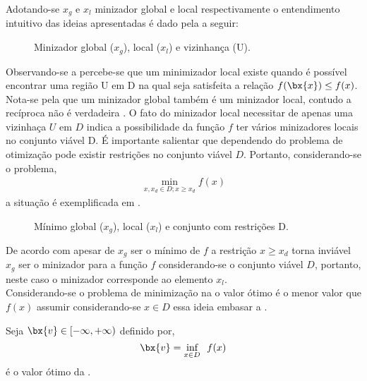   Adotando-se $x_g$ e $x_l$ minizador global e local respectivamente o entendimento intuitivo das ideias apresentadas
  \'e dado pela  a seguir:
  	\begin{figure}[!h]%
		\label{fig1}
		\centering
		\resizebox{0.8\width}{!}{
		 
  	}
		\caption{Minizador global ($x_g$), local ($x_l$) e vizinhan\c ca (U).}
  	\end{figure}

  Observando-se a  percebe-se  que um minimizador local existe quando \'e poss\'ivel
  encontrar uma regi\~ao $\mathrm{U}$ em $\mathrm{D}$ na qual seja satisfeita a rela\c c\~ao $f(\bx{x}) \leq f(x)$.
  Nota-se pela  que um minizador global tamb\'em \'e um minizador local, contudo a rec\'iproca n\~ao 
  \'e verdadeira \cite{alexey}. O fato do minizador local necessitar de apenas uma vizinha\c ca $U$ em $D$  indica a possibilidade da fun\c
  c\~ao $f$ ter 
  v\'arios minizadores locais no conjunto vi\'avel D. \'E importante salientar que dependendo do problema de otimiza\c
  c\~ao pode existir restri\c c\~oes no conjunto vi\'avel $D$. Portanto, considerando-se o problema,
  	\begin{align}%
		\min_{x,x_d \in D; x \geq x_d} f(x)
		\label{eq3}
	\end{align}
  a situa\c c\~ao \'e exemplificada em .
  	\begin{figure}[!htpb]%
		\centering
		\resizebox{0.8\width}{!}{
			
	}
		\caption{M\'inimo global ($x_g$), local ($x_l$) e conjunto com restri\c c\~oes D.}
  		\label{fig11}
	\end{figure}
	\newpage
De acordo com  apesar de $x_g$ ser o m\'inimo de $f$ a restri\c c\~ao $ x\geq x_d$ torna invi\'avel $x_g$
ser o minizador para a fun\c c\~ao $f$ considerando-se o conjunto vi\'avel $D$, portanto, neste caso o minizador
corresponde ao elemento $x_l$.\\
  Considerando-se o problema de minimiza\c c\~ao na  o valor \'otimo \'e 
  o menor valor que $f(x)$ assumir considerando-se $x \in D$ essa ideia embasar a . 
  	\begin{defin}
		\label{def2}
		Seja $\bx {v} \in [-\infty, +\infty)$ definido por,
	  	\begin{equation*}
			\bx {v} =  \underset{x \in D} {\textrm{inf}} \ \ f(x)
	  	\end{equation*}
	  	 \'e o valor \'otimo da .
	\end{defin}
